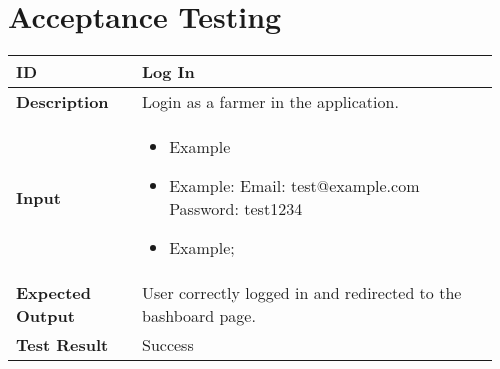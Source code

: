 \chapter{Acceptance Testing} \label{ch:acceptance_testing}


\begin{longtable}{@{}p{0.25\linewidth}p{0.71\linewidth}@{}}
	\toprule
	\textbf{ID} & Log In \\
	\midrule
	\textbf{Description} & Login as a farmer in the application. \\
	\midrule
	\textbf{Input} & \begin{itemize}[leftmargin=.4cm,noitemsep,topsep=0pt,before=\vspace{-3mm},after=\vspace{-4mm}]
		\item Example
		\item Example:\newline
		Email: test@example.com\newline
		Password: test1234
		\item Example;
	\end{itemize}\\
	\midrule
	\textbf{Expected Output} & User correctly logged in and redirected to the bashboard page.\\
	\midrule
	\textbf{Test Result} & Success\\
	\bottomrule
\end{longtable}

